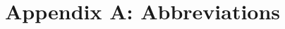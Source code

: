 \section*{Appendix A: Abbreviations}
\begin{flushleft}
\begin{tabular}{ll}


\end{tabular}
\end{flushleft}
